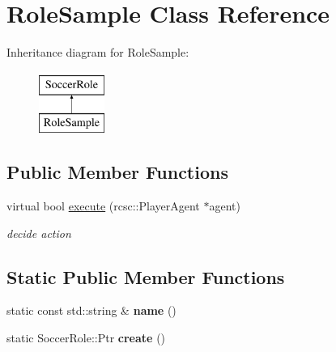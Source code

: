 \hypertarget{classRoleSample}{
\section{RoleSample Class Reference}
\label{classRoleSample}
}
Inheritance diagram for RoleSample:\begin{figure}[H]
\begin{center}
\leavevmode
\includegraphics[height=2.000000cm]{classRoleSample}
\end{center}
\end{figure}
\subsection*{Public Member Functions}
\begin{DoxyCompactItemize}
\item 
\hypertarget{classRoleSample_a7720453142da423561cd21ec72f812e7}{
virtual bool \hyperlink{classRoleSample_a7720453142da423561cd21ec72f812e7}{execute} (rcsc::PlayerAgent $\ast$agent)}
\label{classRoleSample_a7720453142da423561cd21ec72f812e7}

\begin{DoxyCompactList}\small\item\em decide action \item\end{DoxyCompactList}\end{DoxyCompactItemize}
\subsection*{Static Public Member Functions}
\begin{DoxyCompactItemize}
\item 
\hypertarget{classRoleSample_a4abdf868acb54d6f959a71a8d4562ebe}{
static const std::string \& {\bfseries name} ()}
\label{classRoleSample_a4abdf868acb54d6f959a71a8d4562ebe}

\item 
\hypertarget{classRoleSample_ab2b91a94e7fef0f41ab8c1f30df47b0d}{
static SoccerRole::Ptr {\bfseries create} ()}
\label{classRoleSample_ab2b91a94e7fef0f41ab8c1f30df47b0d}

\end{DoxyCompactItemize}
